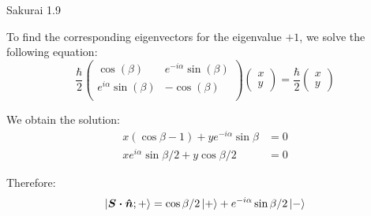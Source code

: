 \documentclass{article}
\begin{document}
\begin{section}{Sakurai 1.9}
\begin{tcolorbox}[breakable]
			To find the corresponding eigenvectors for the eigenvalue $+1$, we solve the following equation:
			\begin{equation*}
				\frac{\hbar}{2}
				\left(
					\begin{array}{cc}
					 \cos (\beta ) & e^{-i \alpha} \sin (\beta ) \\
					 e^{i \alpha} \sin (\beta ) & -\cos (\beta ) \\
					\end{array}
				\right)
				\begin{pmatrix}
					x \\ 
					y
				\end{pmatrix}
				= \frac{\hbar}{2}
				\begin{pmatrix}
					x \\ 
					y
				\end{pmatrix}
		\end{equation*}

		We obtain the solution:
		\begin{align*}
			x (\cos{\beta} -1) + y e^{-i \alpha} \sin{\beta} &= 0 \\
			x e^{i \alpha} \sin{\beta / 2}  + y \cos{\beta / 2} &= 0
		\end{align*}

		Therefore:
		\begin{equation*}
			\ket{\boldsymbol{S \cdot \hat{n}}; +} = \cos{\beta / 2} \ket{+} + e^{-i \alpha} \sin{\beta / 2} \ket{-}
		\end{equation*}
		\end{tcolorbox}
	\end{section}
\end{document}

